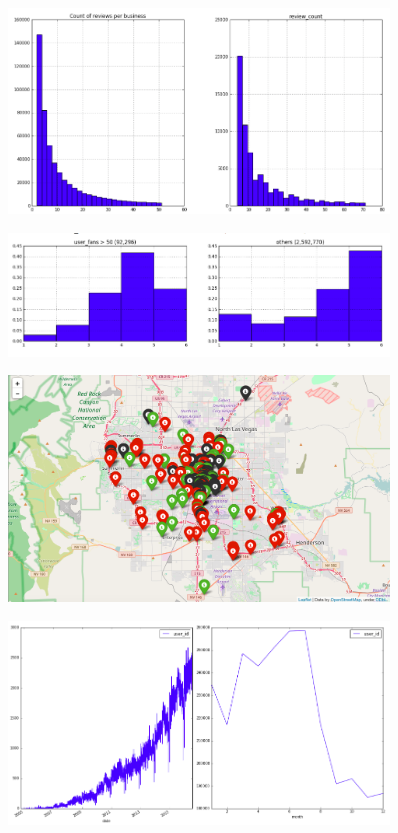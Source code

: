 \documentclass[11pt]{article}
\begin{document}
\begin{figure}[H]
\centering
\includegraphics[width=0.9\textwidth]{./ac209/countreviewshist.png}
\end{figure}

\begin{figure}[H]
\centering
\includegraphics[width=0.9\textwidth]{./ac209/lotsoffans.png}
\end{figure}

\begin{figure}[H]
\centering
\includegraphics[width=0.9\textwidth]{./ac209/mostreviewsbylocationlv.png}
\end{figure}

\begin{figure}[H]
\centering
\includegraphics[width=0.9\textwidth]{./ac209/timeseries.png}
\end{figure}
\end{document}
